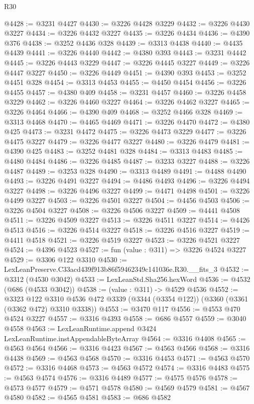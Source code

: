 \begin{lexlean}{R30}
\begin{coremodule}
@4428 := @3231 @4427
@4430 := @3226 @4428 @3229
@4432 := @3226 @4430 @3227
@4434 := @3226 @4432 @3227
@4435 := @3226 @4434
@4436 := @4390 @376
@4438 := @3252 @4436 @328
@4439 := @3313 @4438
@4440 := @4435 @4439
@4441 := @3226 @4440
@4442 := @4380 @393
@4443 := @3231 @4442
@4445 := @3226 @4443 @3229
@4447 := @3226 @4445 @3227
@4449 := @3226 @4447 @3227
@4450 := @3226 @4449
@4451 := @4390 @393
@4453 := @3252 @4451 @328
@4454 := @3313 @4453
@4455 := @4450 @4454
@4456 := @3226 @4455
@4457 := @4380 @409
@4458 := @3231 @4457
@4460 := @3226 @4458 @3229
@4462 := @3226 @4460 @3227
@4464 := @3226 @4462 @3227
@4465 := @3226 @4464
@4466 := @4390 @409
@4468 := @3252 @4466 @328
@4469 := @3313 @4468
@4470 := @4465 @4469
@4471 := @3226 @4470
@4472 := @4380 @425
@4473 := @3231 @4472
@4475 := @3226 @4473 @3229
@4477 := @3226 @4475 @3227
@4479 := @3226 @4477 @3227
@4480 := @3226 @4479
@4481 := @4390 @425
@4483 := @3252 @4481 @328
@4484 := @3313 @4483
@4485 := @4480 @4484
@4486 := @3226 @4485
@4487 := @3233 @3227
@4488 := @3226 @4487
@4489 := @3253 @328
@4490 := @3313 @4489
@4491 := @4488 @4490
@4493 := @3226 @4491 @3227
@4494 := @4486 @4493
@4496 := @3226 @4494 @3227
@4498 := @3226 @4496 @3227
@4499 := @4471 @4498
@4501 := @3226 @4499 @3227
@4503 := @3226 @4501 @3227
@4504 := @4456 @4503
@4506 := @3226 @4504 @3227
@4508 := @3226 @4506 @3227
@4509 := @4441 @4508
@4511 := @3226 @4509 @3227
@4513 := @3226 @4511 @3227
@4514 := @4426 @4513
@4516 := @3226 @4514 @3227
@4518 := @3226 @4516 @3227
@4519 := @4411 @4518
@4521 := @3226 @4519 @3227
@4523 := @3226 @4521 @3227
@4524 := @4396 @4523
@4527 := fun (value : @311) => @3226 @4524 @3227
@4529 := @3306 @122 @3310
@4530 := LexLeanPreserve.C33acd439f913b86f59462349c141036e.R30.__fits_3
@4532 := @3312 (@4530 @3042)
@4533 := LexLeanStd.Sha256.hexWord
@4536 := @4532 (@686 (@4533 @3042))
@4538 := (value : @311) -> @4529 @4536
@4552 := @3323
    @122
    @3310
    @4536
    @472
    @3339
    (@3344 (@3354 @122))
    (@3360 (@3361 (@3362 @472) @3310 @3338))
@4553 := @3470 @117
@4556 := @4553 @470 @4524 @3227
@4557 := @3316 @4393
@4558 := @686 @4557
@4559 := @3040 @4558
@4563 := LexLeanRuntime.append @3424 LexLeanRuntime.instAppendableByteArray
@4564 := @3316 @4408
@4565 := @4563 @4564
@4566 := @3316 @4423
@4567 := @4563 @4566
@4568 := @3316 @4438
@4569 := @4563 @4568
@4570 := @3316 @4453
@4571 := @4563 @4570
@4572 := @3316 @4468
@4573 := @4563 @4572
@4574 := @3316 @4483
@4575 := @4563 @4574
@4576 := @3316 @4489
@4577 := @4575 @4576
@4578 := @4573 @4577
@4579 := @4571 @4578
@4580 := @4569 @4579
@4581 := @4567 @4580
@4582 := @4565 @4581
@4583 := @686 @4582

\end{coremodule}
\end{lexlean}
